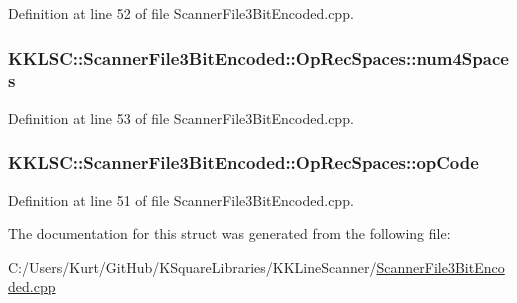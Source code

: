 Definition at line 52 of file Scanner\+File3\+Bit\+Encoded.\+cpp.

\subsubsection[{\texorpdfstring{num4\+Spaces}{num4Spaces}}]{ K\+K\+L\+S\+C\+::\+Scanner\+File3\+Bit\+Encoded\+::\+Op\+Rec\+Spaces\+::num4\+Spaces}\hypertarget{struct_scanner_file3_bit_encoded_1_1_op_rec_spaces_a02cd8c9ab9c259c880cee43e42191ad8}{}\label{struct_scanner_file3_bit_encoded_1_1_op_rec_spaces_a02cd8c9ab9c259c880cee43e42191ad8}


Definition at line 53 of file Scanner\+File3\+Bit\+Encoded.\+cpp.

\subsubsection[{\texorpdfstring{op\+Code}{opCode}}]{ K\+K\+L\+S\+C\+::\+Scanner\+File3\+Bit\+Encoded\+::\+Op\+Rec\+Spaces\+::op\+Code}\hypertarget{struct_scanner_file3_bit_encoded_1_1_op_rec_spaces_a5dd363615637cd86f604ee963e5665da}{}\label{struct_scanner_file3_bit_encoded_1_1_op_rec_spaces_a5dd363615637cd86f604ee963e5665da}


Definition at line 51 of file Scanner\+File3\+Bit\+Encoded.\+cpp.



The documentation for this struct was generated from the following file\+:\begin{DoxyCompactItemize}
\item 
C\+:/\+Users/\+Kurt/\+Git\+Hub/\+K\+Square\+Libraries/\+K\+K\+Line\+Scanner/\hyperlink{_scanner_file3_bit_encoded_8cpp}{Scanner\+File3\+Bit\+Encoded.\+cpp}\end{DoxyCompactItemize}
